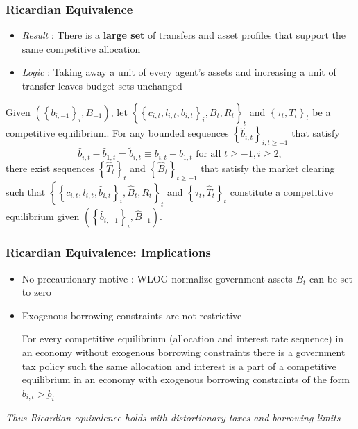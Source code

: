 \documentclass{beamer}
\begin{document}
\begin{frame}
 \frametitle{Ricardian Equivalence}
 \begin{itemize}
  \item \emph{Result} : There is a \textbf{large set} of transfers and asset profiles that support the same competitive allocation
  \item \emph{Logic }: Taking away a unit of every agent's assets and increasing a unit of transfer leaves budget sets unchanged
 \end{itemize}
\begin{theorem}
 
Given $\left( \left \{ b_{i,-1}\right \}
_{i},B_{-1}\right) $, let $\left \{ \left \{ c_{i,t},l_{i,t},b_{i,t}\right \} _{i},B_{t},R_{t}\right \} _{t} $ and $\left \{ \tau _{t},T_{t}\right
\} _{t}$ be a competitive equilibrium. For any bounded sequences $%
\left \{ \hat{b}_{i,t}\right \} _{i,t\geq -1}$ that satisfy
\begin{equation*}
\hat{b}_{i,t}-\hat{b}_{1,t}=\tilde{b}_{i,t}\equiv b_{i,t}	-b_{1,t}\text{ for all }t\geq -1,i\geq 2,
\end{equation*}%
there exist  sequences $\left \{ \hat{T}_{t}\right \} _{t}$ and $%
\left \{ \hat{B}_{t}\right \} _{t\geq -1}$ that satisfy the market clearing such that $\left \{ \left \{ c_{i,t},l_{i,t},\hat{b}%
_{i,t}\right \} _{i},\hat{B}_{t},R_{t}\right \} _{t}$ and $\left \{
\tau _{t},\hat{T}_{t}\right \} _{t}$ constitute a competitive
equilibrium given $\left( \left \{ \hat{b}_{i,-1}\right \} _{i},\hat{B}%
_{-1}\right) $.
\end{theorem}

 
\end{frame}

\begin{frame}
 \frametitle{Ricardian Equivalence: Implications}
 \begin{itemize}
 \item No precautionary motive : WLOG normalize government assets $B_t$ can be set to zero
  \item Exogenous borrowing constraints are not restrictive
\begin{theorem}
 For every  competitive
equilibrium (allocation and interest rate sequence)  in an economy without
exogenous borrowing constraints there is a government tax policy such the same allocation and interest is a part of a competitive equilibrium
in an economy with exogenous borrowing constraints of the form $b_{i,t}>\underbar{b}_i$
\end{theorem}
  \end{itemize}

  \color{red}\emph{Thus Ricardian equivalence holds with distortionary taxes and borrowing limits}
  
\end{frame}
\end{document}
